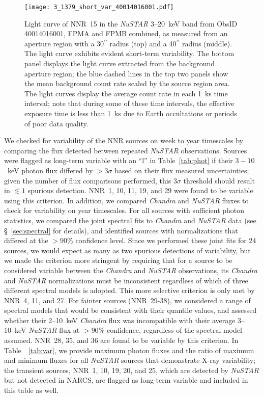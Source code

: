 \documentclass[iop,revtex4]{emulateapj}
\begin{document}
\begin{figure}
\texttt{[image: 3\_1379\_short\_var\_40014016001.pdf]}
\caption{Light curve of NNR~15 in the \textit{NuSTAR} 3--20~keV band from ObsID 40014016001, FPMA and FPMB combined, as measured from an aperture region with a 30$^{\prime\prime}$ radius (top) and a 40$^{\prime\prime}$ radius (middle).  The light curve exhibits evident short-term variability.  The bottom panel displays the light curve extracted from the background aperture region; the blue dashed lines in the top two panels show the mean background count rate scaled by the source region area.  The light curves display the average count rate in each 1~ks time interval; note that during some of these time intervals, the effective exposure time is less than 1~ks due to Earth occultations or periods of poor data quality.}
\label{fig:lightcurves}
\end{figure}
We checked for variability of the NNR sources on week to year
timescales by comparing the flux detected between repeated \textit{NuSTAR}
observations. Sources were flagged as long-term variable with an ``l'' in Table~\ref{tab:phot} if their $3-10$~keV photon flux differed by $>3\sigma$ based on their flux measured uncertainties; given the number of flux comparisons performed, this $3\sigma$ threshold should result in $\lesssim1$ spurious detection.  NNR~1, 10, 11, 19, and 29 were found to be variable using this criterion.  In addition, we compared \textit{Chandra} and \textit{NuSTAR} fluxes to check for variability on year timescales.  For all sources with sufficient photon statistics, we compared the joint spectral fits to \textit{Chandra} and \textit{NuSTAR} data (see \S~\ref{sec:spectral} for details), and identified sources with normalizations that differed at the $>90$\% confidence level.  Since we performed these joint fits for 24 sources, we would expect as many as two spurious detections of variability, but we made the criterion more stringent by requiring that for a source to be considered variable between the \textit{Chandra} and \textit{NuSTAR} observations, its \textit{Chandra} and \textit{NuSTAR} normalizations must be inconsistent regardless of which of three different spectral models is adopted.  This more selective criterion is only met by NNR~4, 11, and 27.  For fainter sources (NNR~29-38), we considered a range of spectral models that would be consistent with their quantile values, and assessed whether their 2--10~keV \textit{Chandra} flux was incompatible with their average 3--10~keV \textit{NuSTAR} flux at $>90$\% confidence, regardless of the spectral model assumed.  NNR~28, 35, and 36 are found to be variable by this criterion.  In Table~~\ref{tab:var}, we provide maximum photon fluxes and the ratio of maximum and minimum fluxes for all \textit{NuSTAR} sources that demonstrate X-ray variability; the transient sources, NNR~1, 10, 19, 20, and 25, which are detected by \textit{NuSTAR} but not detected in NARCS, are flagged as long-term variable and included in this table as well. \par
\end{document}

